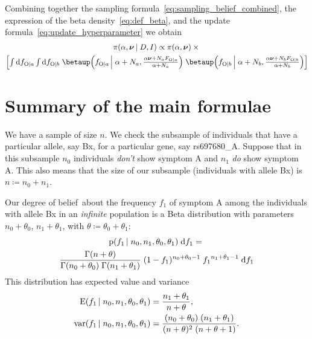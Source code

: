\documentclass[\ifafour a4paper,12pt,\else a5paper,10pt,\fi%
onecolumn,oneside,article,%
british%
]{memoir}
\theoremstyle{remark}
\theoremstyle{innote}
\newcommand*{\di}{\mathrm{d}}%
\newcommand*{\defd}{\coloneqq}
\newcommand*{\pf}{\mathrm{p}}%
\newcommand*{\E}{\mathrm{E}}
\renewcommand*{\|}[1][]{\nonscript\,#1\vert\nonscript\;\mathopen{}}
\newcommand*{\tint}{\begingroup\textstyle\int\endgroup\nolimits}
\newcommand*{\dob}{degree of belief}
\DeclareMathOperator{\var}{var}
\newcommand*{\yD}{D}
\newcommand*{\yI}{I}
\newcommand*{\ya}{a}
\newcommand*{\yb}{b}
\newcommand*{\ysO}{\textrm{O}}%
\newcommand*{\dbeta}{\betaup}
\newcommand*{\dA}{\pi}
\newcommand*{\yA}{\alpha}
\newcommand*{\yqq}{\nu}
\newcommand*{\yq}{\bm{\yqq}}
\begin{document}
Combining together the sampling
formula~\eqref{eq:sampling_belief_combined}, the expression of the beta
density~\eqref{eq:def_beta}, and the update
formula~\eqref{eq:update_hyperparameter} we obtain
\begin{multline}
  \label{eq:parameter_posterior_first}
  \dA(\yA,\yq \|\yD, \yI) \propto
    \dA(\yA,\yq) \times{}\\
  \Bigl[   \tint\di f_{\ysO\|\ya}\tint\di f_{\ysO\|\yb}\;
  \dbeta\Bigl(f_{\ysO\|\ya} \|[\Big] \yA+N_{\ya},
  \frac{\yA\yq+N_{\ya}F_{\ysO\|\ya}}{\yA+N_{\ya}}
    \Bigl)\;
  \dbeta\Bigl(f_{\ysO\|\yb} \|[\Big] \yA+N_{\yb},
  \frac{\yA\yq+N_{\yb}F_{\ysO\|\yb}}{\yA+N_{\yb}}
    \Bigr)
       \Bigr]
\end{multline}


\section{Summary of the main formulae}

We have a sample of size $n$. We check the subsample of individuals that
have a particular allele, say Bx, for a particular gene, say rs697680\_A.
Suppose that in this subsample $n_0$ individuals \emph{don't} show symptom
A and $n_1$ \emph{do} show symptom A. This also means that the size of our
subsample (individuals with allele Bx) is $n \defd n_0+n_1$.

Our \dob\ about the frequency $f_1$ of symptom A among the individuals with
allele Bx in an \emph{infinite} population is a Beta distribution with
parameters $n_0+\theta_0$, $n_1+\theta_1$, with
$\theta \defd \theta_0+\theta_1$:
\begin{multline}
  \label{eq:beta_fr}
  \pf(f_1 \| n_0,n_1,\theta_0,\theta_1)\;\di f_1 ={}\\
  \frac{\Gamma(n+\theta)}{\Gamma(n_0+\theta_0)\;\Gamma(n_1+\theta_1)}
  \; (1-f_1)^{n_0+\theta_0-1}\;{f_1}^{n_1+\theta_1-1} \;\di f_1
\end{multline}
This distribution has expected value and variance
\begin{equation}
  \label{eq:exp_value}
  \begin{split}
  \E(f_1 \| n_0, n_1, \theta_0,\theta_1) &= \frac{n_1+\theta_1}{n+\theta},
  \\
  \var(f_1 \|  n_0, n_1, \theta_0,\theta_1) &=
  \frac{(n_0+\theta_0)\;(n_1+\theta_1)}{(n+\theta)^2\;(n+\theta+1)}.
\end{split}
\end{equation}
\end{document}
